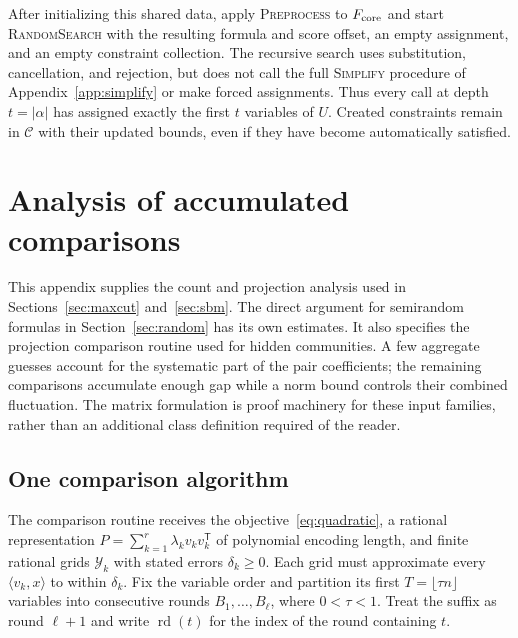 \documentclass[11pt,a4paper]{article}
\theoremstyle{definition}
\theoremstyle{remark}
\begin{document}
After initializing this shared data, apply
\textnormal{\textsc{Preprocess}} to $F_{\rm core}$ and start
\textnormal{\textsc{RandomSearch}} with the resulting formula and score
offset, an empty assignment, and an empty constraint collection.
The recursive search uses substitution, cancellation, and rejection,
but does not call the full \textnormal{\textsc{Simplify}} procedure of
Appendix~\ref{app:simplify} or
make forced assignments. Thus every call at depth $t=|\alpha|$ has
assigned exactly the first $t$ variables of $U$. Created constraints
remain in $\mathcal C$ with their updated bounds, even if they have
become automatically satisfied.

\section{Analysis of accumulated comparisons}\label{sec:counts}\label{app:accumulation}

This appendix supplies the count and projection analysis used in
Sections~\ref{sec:maxcut} and~\ref{sec:sbm}. The direct argument for
semirandom formulas in Section~\ref{sec:random} has its own estimates.
It also specifies the projection comparison routine used for hidden
communities. A few aggregate guesses account for the systematic part of the pair
coefficients; the remaining comparisons accumulate enough gap while a norm bound
controls their combined fluctuation. The matrix formulation is proof
machinery for these input families, rather than an additional class
definition required of the reader.

\subsection{One comparison algorithm}

The comparison routine receives the objective~\eqref{eq:quadratic},
a rational representation
$P=\sum_{k=1}^r\lambda_kv_kv_k^{\mathsf T}$ of polynomial encoding length,
and finite rational grids $\mathcal Y_k$ with stated errors $\delta_k\ge0$.
Each grid must approximate every $\langle v_k,x\rangle$ to within
$\delta_k$. Fix the variable order and partition its first
$T=\lfloor\tau n\rfloor$ variables into consecutive rounds
$B_1,\ldots,B_\ell$, where $0<\tau<1$. Treat the suffix as round
$\ell+1$ and write $\operatorname{rd}(t)$ for the index of the round containing $t$.
\end{document}
